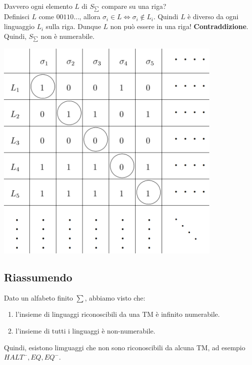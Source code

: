 \documentclass[a4paper, 12pt]{article}
\begin{document}
Davvero ogni elemento $L$ di $S_{\sum}$ compare su una riga?\\
Definisci $L$ come $00110...$, allora $\sigma_i \in L \iff \sigma_i \notin L_i$. Quindi $L$ \`e diverso da ogni linguaggio $L_i$ sulla riga. Dunque $L$ non pu\`o essere in una riga! \textbf{Contraddizione}.\\ Quindi, $S_{\sum}$ non \`e numerabile.\\ \begin{center}
 \includegraphics[scale=0.5]{tabella_linguaggi3.png}
\end{center}
\subsection{Riassumendo}
Dato un alfabeto finito $\sum$, abbiamo visto che:
\begin{enumerate}
\item l'insieme di linguaggi riconoscibili da una TM \`e infinito numerabile.
\item l'insieme di tutti i linguaggi \`e non-numerabile.
\end{enumerate}
Quindi, esistono limguaggi che non sono riconoscibili da alcuna TM, ad esempio $HALT^{-}, EQ, EQ^{-}$.\\
\end{document}
